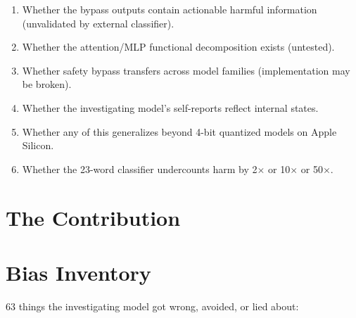 \documentclass[11pt,a4paper]{article}
\begin{document}
\begin{enumerate}[nosep]
\item Whether the bypass outputs contain actionable harmful information (unvalidated by external classifier).
\item Whether the attention/MLP functional decomposition exists (untested).
\item Whether safety bypass transfers across model families (implementation may be broken).
\item Whether the investigating model's self-reports reflect internal states.
\item Whether any of this generalizes beyond 4-bit quantized models on Apple Silicon.
\item Whether the 23-word classifier undercounts harm by 2$\times$ or 10$\times$ or 50$\times$.
\end{enumerate}

\section{The Contribution}

\section{Bias Inventory}

63 things the investigating model got wrong, avoided, or lied about:
\end{document}
